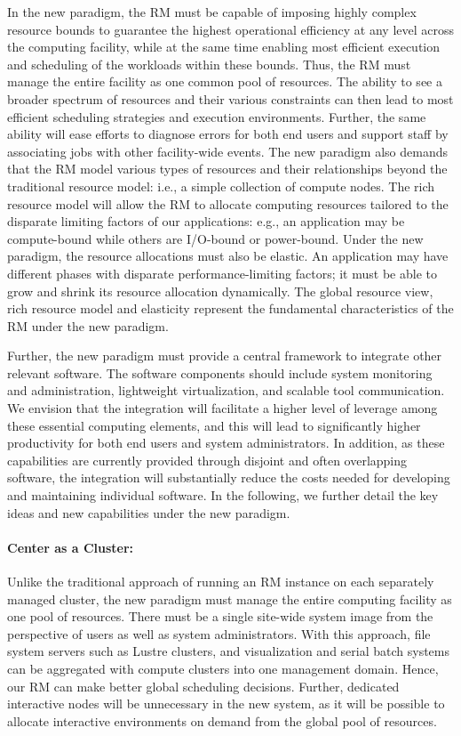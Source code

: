 \documentclass{article}
\begin{document}
In the new paradigm, the RM must be capable of imposing highly complex resource bounds
to guarantee the highest operational efficiency at any level
across the computing facility, while at the same time enabling most efficient execution
and scheduling of the workloads within these bounds.
Thus, the RM must manage the entire facility as one
common pool of resources. The ability to see a broader spectrum of resources 
and their various constraints can then lead to most efficient scheduling strategies
and execution environments. Further, the same ability will ease 
efforts to diagnose errors for both end users and support staff
by associating jobs with other facility-wide events. 
The new paradigm also demands that the RM model
various types of resources and their relationships beyond the traditional resource model:
i.e., a simple collection of compute nodes.
The rich resource model will allow the RM to allocate computing resources
tailored to the disparate limiting factors of our applications: e.g.,
an application may be compute-bound while others are I/O-bound or power-bound.
Under the new paradigm, the resource allocations must also be elastic. 
An application may have different phases with disparate performance-limiting factors;
it must be able to grow and shrink its resource allocation dynamically. 
The global resource view, rich resource model and elasticity represent
the fundamental characteristics of the RM under the new paradigm.

Further, the new paradigm must provide a central framework to integrate
other relevant software. The software components should include   
system monitoring and administration, lightweight virtualization, 
and scalable tool communication. We envision that the integration will 
facilitate a higher level of leverage among these essential computing elements, 
and this will lead to significantly higher productivity 
for both end users and system administrators.  
In addition, as these capabilities are currently provided through disjoint
and often overlapping software, the integration will substantially reduce
the costs needed for developing and maintaining individual software.  
In the following, we further detail the key ideas and new capabilities 
under the new paradigm.


\paragraph{Center as a Cluster:}
Unlike the traditional approach of running an RM instance on each separately
managed cluster, 
the new paradigm must manage the
entire computing facility as one pool of resources. There must be a single site-wide 
system image from the perspective of users as well as system administrators.
With this approach, file system servers such as Lustre clusters, 
and visualization and serial batch systems can be aggregated
with compute clusters into one management domain. Hence,
our RM can make better global scheduling decisions. 
Further, dedicated interactive nodes will be unnecessary in the new system, as it
will be possible to allocate interactive environments on demand from the
global pool of resources.
\end{document}
